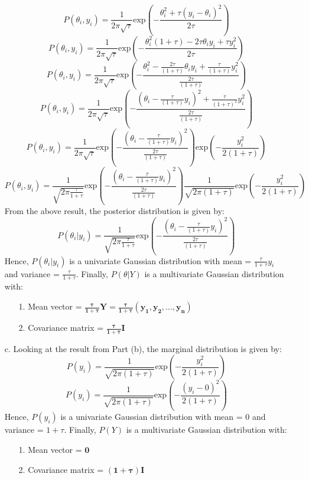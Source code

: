 \documentclass[twoside]{homework}
\begin{document}
\begin{itemize}
    $$P(\theta_i,y_i)={}\frac{1}{2\pi\sqrt{\tau}}\text{exp}(-\frac{\theta_i^2+\tau(y_i-\theta_i)^2}{2\tau})$$
    $$P(\theta_i,y_i)={}\frac{1}{2\pi\sqrt{\tau}}\text{exp}(-\frac{\theta_i^2(1+\tau)-2\tau\theta_iy_i+\tau{}y_i^2}{2\tau})$$
    $$P(\theta_i,y_i)={}\frac{1}{2\pi\sqrt{\tau}}\text{exp}(-\frac{\theta_i^2-\frac{2\tau}{(1+\tau)}\theta_iy_i+\frac{\tau}{(1+\tau)}y_i^2}{\frac{2\tau}{(1+\tau)}})$$
    $$P(\theta_i,y_i)={}\frac{1}{2\pi\sqrt{\tau}}\text{exp}(-\frac{(\theta_i-\frac{\tau}{(1+\tau)}y_i)^2+\frac{\tau}{(1+\tau)^2}y_i^2}{\frac{2\tau}{(1+\tau)}})$$
    $$P(\theta_i,y_i)={}\frac{1}{2\pi\sqrt{\tau}}\text{exp}(-\frac{(\theta_i-\frac{\tau}{(1+\tau)}y_i)^2}{\frac{2\tau}{(1+\tau)}})\text{exp}(-\frac{y_i^2}{2(1+\tau)})$$
    $$P(\theta_i,y_i)={}\frac{1}{\sqrt{2\pi\frac{\tau}{1+\tau}}}\text{exp}(-\frac{(\theta_i-\frac{\tau}{(1+\tau)}y_i)^2}{\frac{2\tau}{(1+\tau)}})\frac{1}{\sqrt{2\pi(1+\tau)}}\text{exp}(-\frac{y_i^2}{2(1+\tau)})$$
    From the above result, the posterior distribution is given by:
    $$P(\theta_i|y_i)=\frac{1}{\sqrt{2\pi\frac{\tau}{1+\tau}}}\text{exp}(-\frac{(\theta_i-\frac{\tau}{(1+\tau)}y_i)^2}{\frac{2\tau}{(1+\tau)}})$$
    Hence, $P(\theta_i|y_i)$ is a univariate Gaussian distribution with mean = $\frac{\tau}{1+\tau}y_i$ and variance = $\frac{\tau}{1+\tau}$. Finally, $P(\theta|Y)$ is a multivariate Gaussian distribution with:
    \begin{itemize}
        \item [1.] Mean vector = $\boldsymbol{\frac{\tau}{1+\tau}Y=\frac{\tau}{1+\tau}(y_1, y_2, ..., y_n)}$
        \item [2.] Covariance matrix = $\boldsymbol{\frac{\tau}{1+\tau}I}$
    \end{itemize}
    \newpage
    \item [c.] Looking at the result from Part (b), the marginal distribution is given by:
    $$P(y_i)=\frac{1}{\sqrt{2\pi(1+\tau)}}\text{exp}(-\frac{y_i^2}{2(1+\tau)})$$
    $$P(y_i)=\frac{1}{\sqrt{2\pi(1+\tau)}}\text{exp}(-\frac{(y_i-0)^2}{2(1+\tau)})$$
    Hence, $P(y_i)$ is a univariate Gaussian distribution with mean = $0$ and variance = $1+\tau$. Finally, $P(Y)$ is a multivariate Gaussian distribution with:
    \begin{itemize}
        \item [1.] Mean vector = $\boldsymbol{0}$
        \item [2.] Covariance matrix = $\boldsymbol{(1+\tau)I}$
    \end{itemize}
\end{itemize}
\end{document}

